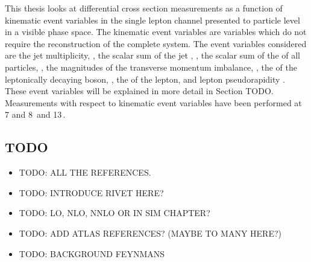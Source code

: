 This thesis looks at differential cross section measurements as a function of kinematic event variables in the single lepton channel presented to particle level in a visible phase space.
The kinematic event variables are variables which do not require the reconstruction of the complete \ttbar{} system.
The event variables considered are the jet multiplicity, \NJET{}, the scalar sum of the jet \pt{}, \HT{}, the scalar sum of the \pt{} of all particles, \ST{}, the magnitudes of the transverse momentum imbalance, \ptmiss{}, the \pt{} of the leptonically decaying \Wboson{} boson, \WPT{}, the \pt{} of the lepton, \LPT{} and lepton pseudorapidity \LETA{}.
These event variables will be explained in more detail in Section TODO.
Measurements with respect to kinematic event variables have been performed at 7 and 8\TeV{}\,\cite{TOP12042} and 13\TeV{}\,\cite{TOP16014}.

\subsection{TODO} %
\label{sub:why_top_physics_is_interesting}
\begin{itemize}
	\item TODO: ALL THE REFERENCES.
	\item TODO: INTRODUCE RIVET HERE?
	\item TODO: LO, NLO, NNLO OR IN SIM CHAPTER?
	\item TODO: ADD ATLAS REFERENCES? (MAYBE TO MANY HERE?)
	\item TODO: BACKGROUND FEYNMANS
\end{itemize}

